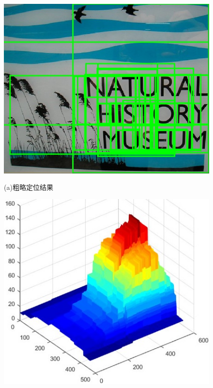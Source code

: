         \begin{figure}[htbp]
        \begin{minipage}[t]{0.37\linewidth}
        \centering
        \includegraphics[width=\textwidth]{./figures/c4_img.jpg}
        \centerline{\small (a)粗略定位结果}
        \end{minipage}
        \begin{minipage}[t]{0.35\linewidth}
        \centering
        \includegraphics[width=\textwidth]{./figures/c4_static_skeleton_response.jpg}

\end{minipage}
\end{figure}
